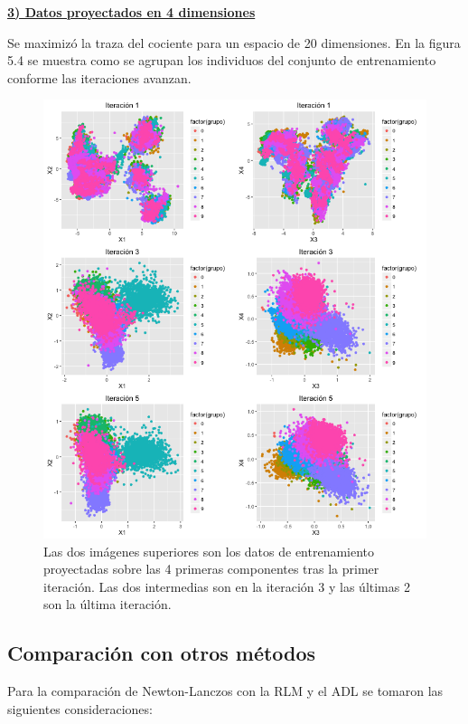 \pagebreak
\underline{\textbf{3) Datos proyectados en 4 dimensiones}}

Se maximizó la traza del cociente para un espacio de 20 dimensiones. En la figura 5.4 se muestra como se agrupan los individuos del conjunto de entrenamiento conforme las iteraciones avanzan. 
  
\begin{figure}[!ht]
  \centering
	\includegraphics[width=1\textwidth]{Figures/Chapter4_ejemplo20componentes.png}	
  \caption[Ejemplo de proyección en 20 dimensiones (MNIST)]
  {Las dos imágenes superiores son los datos de entrenamiento proyectadas sobre las 4 primeras componentes tras la primer iteración. Las dos intermedias son en la iteración 3 y las últimas 2 son la última iteración.}
\end{figure}

\pagebreak

\subsection{Comparación con otros métodos}

Para la comparación de Newton-Lanczos con la RLM y el ADL se tomaron las siguientes consideraciones:

